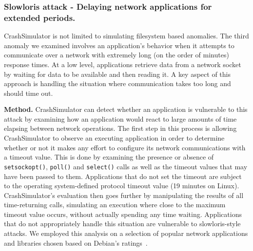\subsubsection{Slowloris attack -  Delaying network applications for extended
periods.}
\label{sec-timeout-bugs}

CrashSimulator is not limited to simulating filesystem based anomalies.
The third anomaly we examined involves an application's behavior when it
attempts to communicate over a network with extremely long (on the order of
minutes) response times.  At a low level, applications retrieve data from a
network socket by waiting for data to be available and then reading it.  A
key aspect of this approach is handling the situation where communication
takes too long and should time out.

{\bf Method.} CrashSimulator can detect whether an application is
vulnerable to this attack by examining how an application would react to
large amounts of time elapsing between network operations.
The first step in this process
is allowing CrashSimulator to observe an executing application
in order to determine whether or not it makes any effort
to configure its network communications with a timeout value. This is done
by examining the presence or absence of {\tt setsockopt()}, {\tt poll()}
and {\tt select()} calls as well as the timeout values that may
have been passed to them. Applications that do not set the timeout are
subject to the operating system-defined protocol timeout value (19 minutes
on Linux).  CrashSimulator's evaluation then goes further by manipulating
the results of all
time-returning calls, simulating an execution where close
to the maximum timeout value occurs, without actually spending any time
waiting.  Applications that do not appropriately handle this situation are
vulnerable to slowloris-style attacks.  We employed this analysis on a
selection of popular network applications and libraries chosen based on
Debian's ratings~\cite{DebPopCon}.

